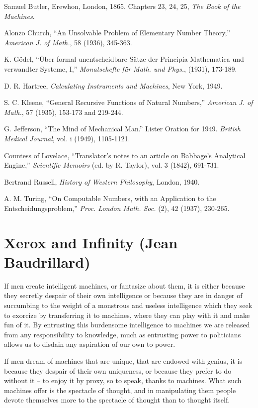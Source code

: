 \documentclass[10pt,twoside,openright]{memoir}
\begin{document}
\begin{hangparas}{1.5em}{1}

Samuel Butler, Erewhon, London, 1865. Chapters 23, 24, 25, \emph{The Book of the Machines}.

Alonzo Church, ``An Unsolvable Problem of Elementary Number Theory,'' \emph{American J. of Math.}, 58 (1936), 345-363.

K. G\"odel, ``\"Uber formal unentscheidbare S\"atze der Principia Mathematica und verwandter Systeme, I,'' \emph{Monatschefte f\"ur Math. und Phys.}, (1931), 173-189.

D. R. Hartree, \emph{Calculating Instruments and Machines}, New York, 1949.

S. C. Kleene, ``General Recursive Functions of Natural Numbers,'' \emph{American J. of Math.}, 57 (1935), 153-173 and 219-244.

G. Jefferson, ``The Mind of Mechanical Man.'' Lister Oration for 1949. \emph{British Medical Journal}, vol. i (1949), 1105-1121.

Countess of Lovelace, ``Translator's notes to an article on Babbage's Analytical Engine,'' \emph{Scientific Memoirs} (ed. by R. Taylor), vol. 3 (1842), 691-731.

Bertrand Russell, \emph{History of Western Philosophy}, London, 1940.

A. M. Turing, ``On Computable Numbers, with an Application to the Entscheidungsproblem,'' \emph{Proc. London Math. Soc.} (2), 42 (1937), 230-265.
\end{hangparas}


\chapter{Xerox and Infinity (Jean Baudrillard)}

If men create intelligent machines, or fantasize about them, it is either because they secretly despair of their own intelligence or because they are in danger of succumbing to the weight of a monstrous and useless intelligence which they seek to exorcize by transferring it to machines, where they can play with it and make fun of it. By entrusting this burdensome intelligence to machines we are released from any responsibility to knowledge, much as entrusting power to politicians allows us to disdain any aspiration of our own to power.

If men dream of machines that are unique, that are endowed with genius, it is because they despair of their own uniqueness, or because they prefer to do without it -- to enjoy it by proxy, so to speak, thanks to machines. What such machines offer is the spectacle of thought, and in manipulating them people devote themselves more to the spectacle of thought than to thought itself. 
\end{document}

